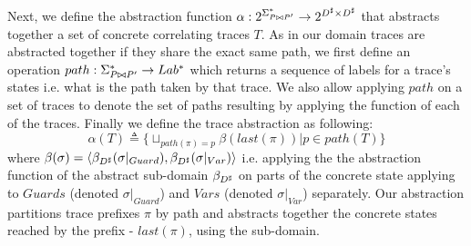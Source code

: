 Next, we define the abstraction function $\alpha : 2^{\Sigma^{*}_{P \bowtie P'}} \rightarrow 2^{D^\sharp \times D^\sharp}$ that abstracts together a set of concrete correlating traces $T$. As in our domain traces are abstracted together if they share the exact same path, we first define an operation $path : \Sigma^{*}_{P \bowtie P'} \rightarrow Lab^{*}$ which returns a sequence of labels for a trace's states i.e. what is the path taken by that trace. We also allow applying $path$ on a set of traces to denote the set of paths resulting by applying the function of each of the traces. Finally we define the trace abstraction as following:
\[
\alpha(T) \triangleq \{ \sqcup_{path(\pi)=p} \beta(last(\pi)) | p \in path(T) \}
\]
where $\beta(\sigma) = \langle \beta_{D^\sharp}(\sigma|_{Guard}), \beta_{D^\sharp}(\sigma|_{Var}) \rangle$  i.e. applying the the abstraction function of the abstract sub-domain $\beta_{D^\sharp}$ on parts of the concrete state applying to $Guards$ (denoted $\sigma|_{Guard}$) and $Vars$ (denoted $\sigma|_{Var}$) separately. Our abstraction partitions trace prefixes $\pi$ by path and abstracts together the concrete states reached by the prefix - $last(\pi)$, using the sub-domain.

